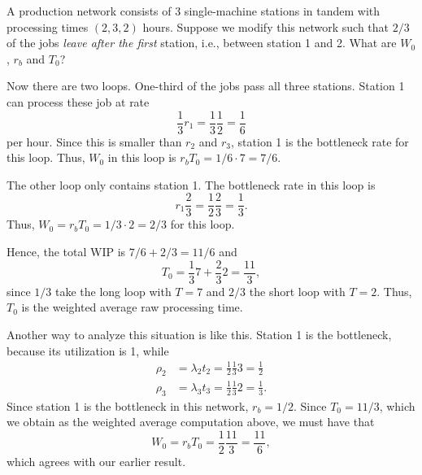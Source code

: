 \begin{exercise}
 A production network consists of 3 single-machine stations in tandem
 with processing times $(2, 3, 2)$ hours. Suppose we modify this
 network such that $2/3$ of the jobs \emph{ leave after the first}
 station, i.e., between station 1 and 2. What are $W_0$, $r_b$ and
 $T_0$? 
\begin{solution}
 Now there are two loops. One-third of the jobs pass all three
 stations. Station 1 can process these job at rate 
 \begin{equation*}
\frac13 r_1 = \frac 13 \frac 12=\frac 16
 \end{equation*}
 per hour. Since this is smaller than $r_2$ and $r_3$, station 1 is
 the bottleneck rate for this loop. Thus, $W_0$ in this loop is
 $r_b T_0 = 1/6\cdot 7 = 7/6$.

 The other loop only contains station 1. The bottleneck rate in this
 loop is 
 \begin{equation*}
r_1\frac23 = \frac12\frac23 = \frac13. 
 \end{equation*}
Thus,
 $W_0 = r_b T_0 = 1/3\cdot 2 = 2/3$ for this loop. 

Hence, the total WIP is $7/6 + 2/3 = 11/6$ and
\begin{equation*}
T_0 = \frac13 7 + \frac 23 2=\frac{11}3,
\end{equation*}
since $1/3$ take the long loop with $T=7$ and $2/3$ the short loop
with $T=2$. Thus, $T_0$ is the weighted average raw processing time.

Another way to analyze this situation is like this. Station 1 is the
bottleneck, because its utilization is 1, while
\begin{align*}
 \rho_2 &= \lambda_2 t_2 = \frac12\frac13 3 = \frac 12\\
 \rho_3 &= \lambda_3 t_3 = \frac12\frac13 2 = \frac 13.
\end{align*}
Since station 1 is the bottleneck in this network, $r_b=1/2$. Since
$T_0 = 11/3$, which we obtain as the weighted average computation
above, we must have that 
\begin{equation*}
W_0 = r_b T_0 = \frac12\frac{11}3 = \frac{11}6, 
\end{equation*}
which agrees with our earlier result.
\end{solution}
\end{exercise}


